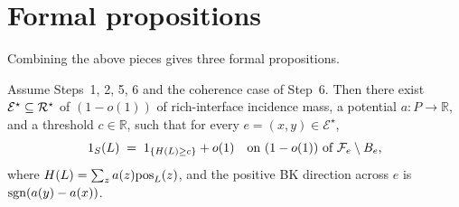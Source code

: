 \section{Formal propositions}\label{sec:formal}

Combining the above pieces gives three formal propositions.

\begin{proposition}\label{prop:71}
Assume Steps~1, 2, 5, 6 and the coherence case of Step~6.
Then there exist $\mathcal{E}^\star\subseteq\mathcal{R}^\star$ of $(1-o(1))$
of rich-interface incidence mass, a potential $a\colon P\to\mathbb{R}$,
and a threshold $c\in\mathbb{R}$, such that for every
$e=(x,y)\in\mathcal{E}^\star$,
\[
  1_S(L) \;=\; 1_{\{H(L)\ge c\}} + o(1)
  \quad\text{on $(1-o(1))$ of $\mathcal{F}_{e}\setminus B_e$,}
\]
where $H(L)=\sum_z a(z)\mathrm{pos}_L(z)$, and the positive BK direction
across $e$ is $\operatorname{sgn}(a(y)-a(x))$.
\end{proposition}

